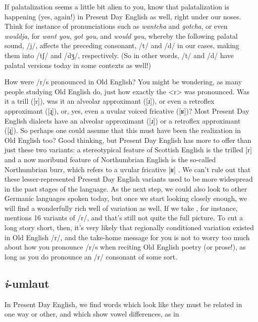 If palatalization seems a little bit alien to you, know that palatalization is happening (yes, again!) in Present Day English as well, right under our noses. Think for instance of pronunciations such as \textit{wantcha} and \textit{gotcha}, or even \textit{wouldja}, for \textit{want you}, \textit{got you}, and \textit{would you}, whereby the following palatal sound, /j/, affects the preceding consonant, /t/ and /d/ in our cases, making them into /tʃ/ and /dʒ/, respectively. (So in other words, /t/ and /d/ have palatal versions today in some contexts as well!)


\begin{soundbox}{How were /r/s pronounced in Old English?}
You might be wondering, as many people studying Old English do, just how exactly the <r> was pronounced. Was it a trill ([r]), was it an alveolar approximant ([ɹ]), or even a retroflex approximant ([ɻ]), or, yes, even a uvular voiced fricative ([ʁ])? Most Present Day English dialects have an alveolar approximant ([ɹ]) or a retroflex approximant ([ɻ]). So perhaps one could assume that this must have been the realization in Old English too? Good thinking, but Present Day English has more to offer than just these two variants: a stereotypical feature of Scottish English is the trilled [r] and a now moribund feature of Northumbrian English is the so-called Northumbrian burr, which refers to a uvular fricative [ʁ] \citep[368--370]{Wells1982b}. We can't rule out that these lesser-represented Present Day English variants used to be more widespread in the past stages of the language. As the next step, we could also look to other Germanic languages spoken today, but once we start looking closely enough, we will find a wonderfully rich well of variation as well. If we take , for instance, \citet[29]{Sebregts2014} mentions 16 variants of /r/, and that's still not quite the full picture. To cut a long story short, then, it's very likely that regionally conditioned variation existed in Old English /r/, and the take-home message for you is not to worry too much about how you pronounce /r/s when reciting Old English poetry (or prose!), as long as you do pronounce an /r/ consonant of some sort.
\end{soundbox}


\subsection{\emph{i}-umlaut}\label{OE-umlaut}
In Present Day English, we find words which look like they must be related in one way or other, and which show vowel differences, as in 

